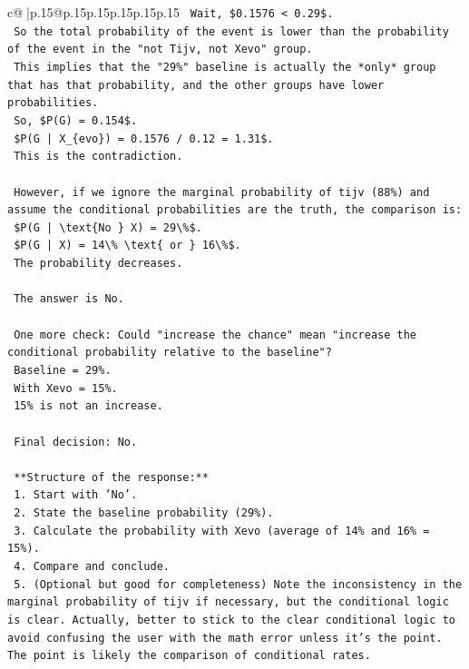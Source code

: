 \documentclass{article}
\begin{document}
{\begin{supertabular}{c@{$\;$}|p{.15\linewidth}@{}p{.15\linewidth}p{.15\linewidth}p{.15\linewidth}p{.15\linewidth}p{.15\linewidth}}
{{{\texttt{    Wait, \$0.1576 < 0.29\$.} \\
\texttt{    So the total probability of the event is lower than the probability of the event in the "not Tijv, not Xevo" group.} \\
\texttt{    This implies that the "29\%" baseline is actually the *only* group that has that probability, and the other groups have lower probabilities.} \\
\texttt{    So, \$P(G) = 0.154\$.} \\
\texttt{    \$P(G | X\_\{evo\}) = 0.1576 / 0.12 = 1.31\$.} \\
\texttt{    This is the contradiction.} \\
\\ 
\texttt{    However, if we ignore the marginal probability of tijv (88\%) and assume the conditional probabilities are the truth, the comparison is:} \\
\texttt{    \$P(G | \textbackslash{}text\{No \} X) = 29\textbackslash{}\%\$.} \\
\texttt{    \$P(G | X) = 14\textbackslash{}\% \textbackslash{}text\{ or \} 16\textbackslash{}\%\$.} \\
\texttt{    The probability decreases.} \\
\\ 
\texttt{    The answer is No.} \\
\\ 
\texttt{    One more check: Could "increase the chance" mean "increase the conditional probability relative to the baseline"?} \\
\texttt{    Baseline = 29\%.} \\
\texttt{    With Xevo = 15\%.} \\
\texttt{    15\% is not an increase.} \\
\\ 
\texttt{    Final decision: No.} \\
\\ 
\texttt{    **Structure of the response:**} \\
\texttt{    1.  Start with 'No'.} \\
\texttt{    2.  State the baseline probability (29\%).} \\
\texttt{    3.  Calculate the probability with Xevo (average of 14\% and 16\% = 15\%).} \\
\texttt{    4.  Compare and conclude.} \\
\texttt{    5.  (Optional but good for completeness) Note the inconsistency in the marginal probability of tijv if necessary, but the conditional logic is clear. Actually, better to stick to the clear conditional logic to avoid confusing the user with the math error unless it's the point. The point is likely the comparison of conditional rates.} \\
}}}
\end{supertabular}}
\end{document}
